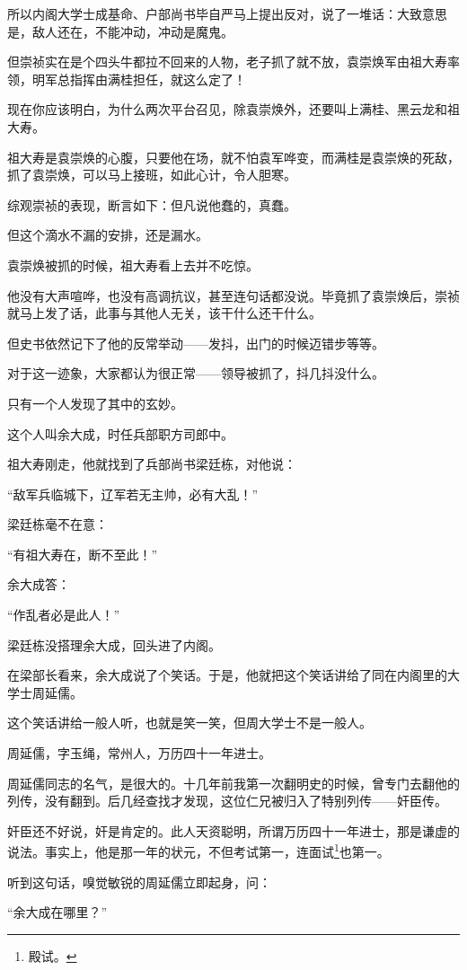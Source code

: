 \begin{multicols}{\theparacolNo}
所以内阁大学士成基命、户部尚书毕自严马上提出反对，说了一堆话：大致意思是，敌人还在，不能冲动，冲动是魔鬼。

但崇祯实在是个四头牛都拉不回来的人物，老子抓了就不放，袁崇焕军由祖大寿率领，明军总指挥由满桂担任，就这么定了！

现在你应该明白，为什么两次平台召见，除袁崇焕外，还要叫上满桂、黑云龙和祖大寿。

祖大寿是袁崇焕的心腹，只要他在场，就不怕袁军哗变，而满桂是袁崇焕的死敌，抓了袁崇焕，可以马上接班，如此心计，令人胆寒。

综观崇祯的表现，断言如下：但凡说他蠢的，真蠢。

但这个滴水不漏的安排，还是漏水。

袁崇焕被抓的时候，祖大寿看上去并不吃惊。

他没有大声喧哗，也没有高调抗议，甚至连句话都没说。毕竟抓了袁崇焕后，崇祯就马上发了话，此事与其他人无关，该干什么还干什么。

但史书依然记下了他的反常举动——发抖，出门的时候迈错步等等。

对于这一迹象，大家都认为很正常——领导被抓了，抖几抖没什么。

只有一个人发现了其中的玄妙。

这个人叫余大成，时任兵部职方司郎中。

祖大寿刚走，他就找到了兵部尚书梁廷栋，对他说：

“敌军兵临城下，辽军若无主帅，必有大乱！”

梁廷栋毫不在意：

“有祖大寿在，断不至此！”

余大成答：

“作乱者必是此人！”

梁廷栋没搭理余大成，回头进了内阁。

在梁部长看来，余大成说了个笑话。于是，他就把这个笑话讲给了同在内阁里的大学士周延儒。

这个笑话讲给一般人听，也就是笑一笑，但周大学士不是一般人。

周延儒，字玉绳，常州人，万历四十一年进士。

周延儒同志的名气，是很大的。十几年前我第一次翻明史的时候，曾专门去翻他的列传，没有翻到。后几经查找才发现，这位仁兄被归入了特别列传——奸臣传。

奸臣还不好说，奸是肯定的。此人天资聪明，所谓万历四十一年进士，那是谦虚的说法。事实上，他是那一年的状元，不但考试第一，连面试\footnote{殿试。}也第一。

听到这句话，嗅觉敏锐的周延儒立即起身，问：

“余大成在哪里？”


\end{multicols}
